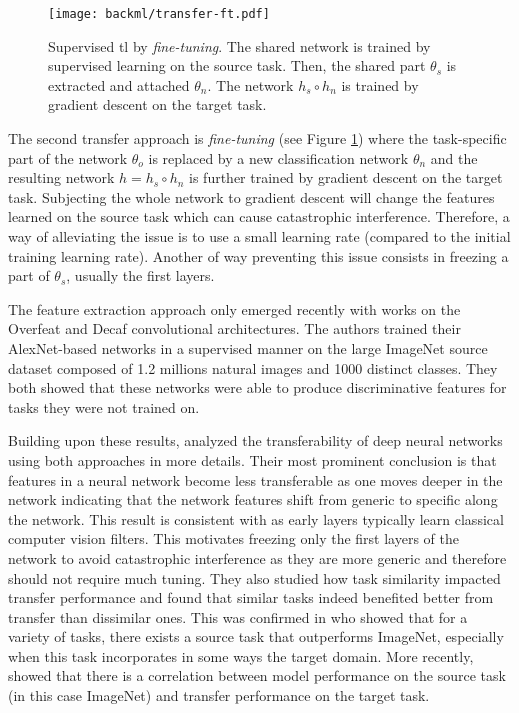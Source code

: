 \begin{figure}
  \centering
  \texttt{[image: backml/transfer-ft.pdf]}
  \caption{Supervised \acrlong{tl} by \textit{fine-tuning}. The shared network is trained by supervised learning on the source task. Then, the shared part $\theta_s$ is extracted and attached $\theta_n$. The network $h_s \circ h_n$ is trained by gradient descent on the target task.}
  \label{fig:backml:transfer-ft}
\end{figure}

The second transfer approach is \textit{fine-tuning} (see Figure \ref{fig:backml:transfer-ft})
where the task-specific part of the network $\theta_{o}$ is replaced by a new
classification network $\theta_{n}$ and the resulting network $h = h_s \circ h_n$
is further trained by gradient descent on the target task. Subjecting the whole
network to gradient descent will change the features learned on the source task
which can cause catastrophic interference. Therefore, a way of alleviating the
issue is to use a small learning rate (compared to the initial training learning
rate). Another of way preventing this issue consists in freezing a part of
$\theta_s$, usually the first layers.

The feature extraction approach only emerged recently with works on the Overfeat
\parencite{sermanet2013overfeat, razavian2014cnn} and Decaf \parencite{donahue2014decaf}
convolutional architectures. The authors trained their AlexNet-based networks in
a supervised manner on the large ImageNet source dataset composed of 1.2 millions
natural images and 1000 distinct classes. They both showed that these networks
were able to produce discriminative features for tasks they were not trained on.

Building upon these results, \parencite{yosinski2014transferable} analyzed the
transferability of deep neural networks using both approaches in more details.
Their most prominent conclusion is that features in a neural network become less
transferable as one moves deeper in the network indicating that the network features
shift from generic to specific along the network. This result is consistent with
\parencite{zeiler2014visualizing} as early layers typically learn classical computer
vision filters. This motivates freezing only the first layers of the network to
avoid catastrophic interference as they are more generic and therefore should not
require much tuning. They also studied how task similarity impacted transfer
performance and found that similar tasks indeed benefited better from transfer
than dissimilar ones. This was confirmed in \parencite{mensink2021factors} who 
showed that for a variety of tasks, there exists a source task that outperforms
ImageNet, especially when this task incorporates in some ways the target domain.
More recently, \parencite{kornblith2019better} showed that there is a correlation 
between model performance on the source task (in this case  ImageNet) and transfer 
performance on the target task. 


